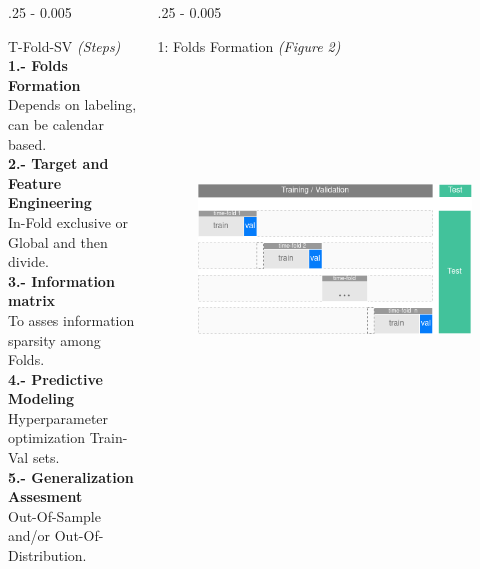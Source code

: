 \documentclass{postertheme}\usepackage[]{graphicx}\usepackage[]{color}
\begin{document}
\begin{frame}
\begin{columns}[onlytextwidth]
\begin{column}{.25 \textwidth - 0.005 \textwidth}
\begin{block}{T-Fold-SV \footnotesize \textit{(Steps)}}
      \textbf{1.- Folds Formation} \\
        Depends on labeling, can be calendar based.\\
      \textbf{2.- Target and Feature Engineering} \\
        In-Fold exclusive or Global and then divide.\\
      \textbf{3.- Information matrix} \\
        To asses information sparsity among Folds.\\
      \textbf{4.- Predictive Modeling} \\
        Hyperparameter optimization Train-Val sets.\\
      \textbf{5.- Generalization Assesment} \\
        Out-Of-Sample and/or Out-Of-Distribution.
        
    \end{block}
  \end{column}

  \begin{column}{.25 \textwidth - 0.005 \textwidth}
    \begin{block}{1: Folds Formation \textit{(Figure 2)}} 
        
      \begin{figure}
        \includegraphics[width=18cm, height=10cm, keepaspectratio=true]{figures/T-Fold-SV.png}
      \end{figure}
        
    \end{block}
  \end{column}
  

\end{columns}
\end{frame}
\end{document}
